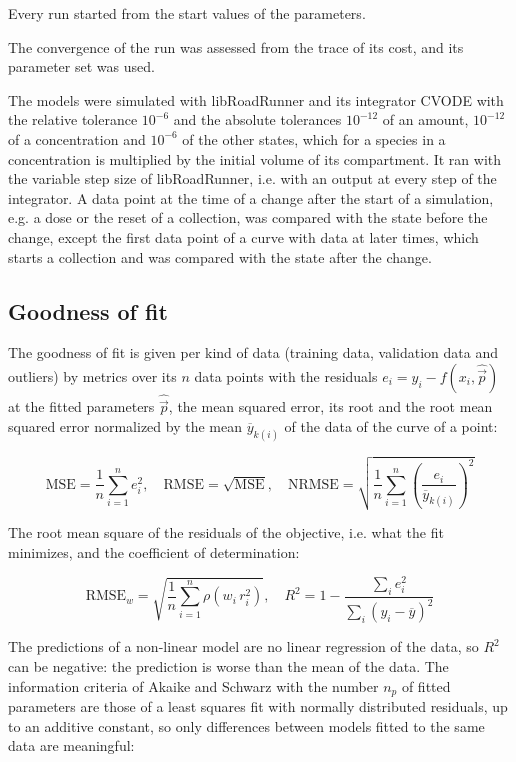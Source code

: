 \documentclass{article}
\begin{document}
Every run started from the start values of the parameters.

The convergence of the run was assessed from the trace of its cost, and its parameter set was used.

The models were simulated with libRoadRunner \cite{Welsh2023} and its integrator CVODE \cite{Hindmarsh2005} with the relative tolerance $10^{-6}$ and the absolute tolerances $10^{-12}$ of an amount, $10^{-12}$ of a concentration and $10^{-6}$ of the other states, which for a species in a concentration is multiplied by the initial volume of its compartment. It ran with the variable step size of libRoadRunner, i.e. with an output at every step of the integrator. A data point at the time of a change after the start of a simulation, e.g. a dose or the reset of a collection, was compared with the state before the change, except the first data point of a curve with data at later times, which starts a collection and was compared with the state after the change.

\subsection{Goodness of fit}

The goodness of fit is given per kind of data (training data, validation data and outliers) by metrics over its $n$ data points with the residuals $e_i = y_i - f(x_i, \hat{\vec{p}})$ at the fitted parameters $\hat{\vec{p}}$, the mean squared error, its root and the root mean squared error normalized by the mean $\overline{y}_{k(i)}$ of the data of the curve of a point:

\begin{equation}
\mathrm{MSE} = \frac{1}{n} \sum_{i=1}^{n} e_i^2, \quad \mathrm{RMSE} = \sqrt{\mathrm{MSE}}, \quad \mathrm{NRMSE} = \sqrt{\frac{1}{n} \sum_{i=1}^{n} \left(\frac{e_i}{\overline{y}_{k(i)}}\right)^2}
\end{equation}

The root mean square of the residuals of the objective, i.e. what the fit minimizes, and the coefficient of determination:

\begin{equation}
\mathrm{RMSE}_w = \sqrt{\frac{1}{n} \sum_{i=1}^{n} \rho\left(w_i\, r_i^2\right)}, \quad R^2 = 1 - \frac{\sum_{i} e_i^2}{\sum_{i} \left(y_i - \overline{y}\right)^2}
\end{equation}

The predictions of a non-linear model are no linear regression of the data, so $R^2$ can be negative: the prediction is worse than the mean of the data. The information criteria of Akaike \cite{Akaike1974} and Schwarz \cite{Schwarz1978} with the number $n_p$ of fitted parameters are those of a least squares fit with normally distributed residuals, up to an additive constant, so only differences between models fitted to the same data are meaningful:
\end{document}
